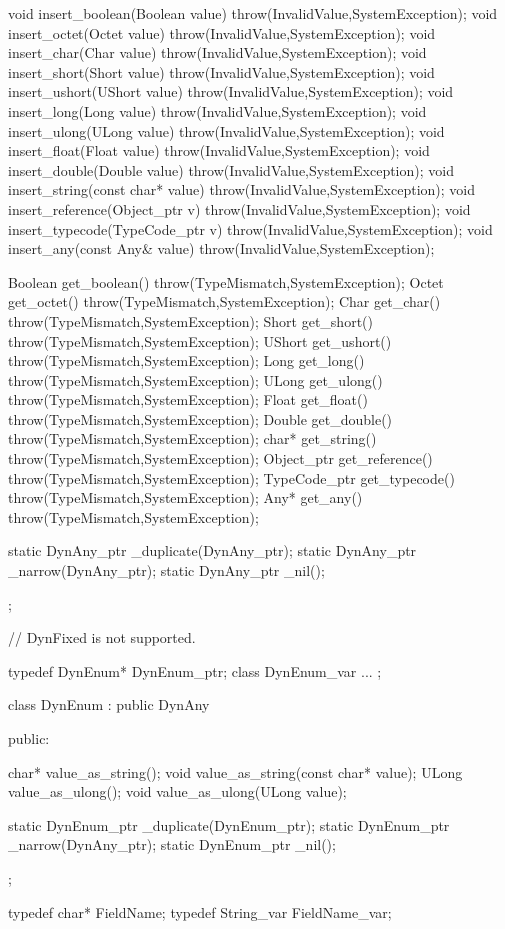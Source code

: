 \documentclass[11pt,twoside,a4paper]{book}
\begin{document}
\begin{cxxlisting}
{  void insert_boolean(Boolean value) throw(InvalidValue,SystemException);
  void insert_octet(Octet value) throw(InvalidValue,SystemException);
  void insert_char(Char value) throw(InvalidValue,SystemException);
  void insert_short(Short value) throw(InvalidValue,SystemException);
  void insert_ushort(UShort value) throw(InvalidValue,SystemException);
  void insert_long(Long value) throw(InvalidValue,SystemException);
  void insert_ulong(ULong value) throw(InvalidValue,SystemException);
  void insert_float(Float value) throw(InvalidValue,SystemException);
  void insert_double(Double value) throw(InvalidValue,SystemException);
  void insert_string(const char* value) throw(InvalidValue,SystemException);
  void insert_reference(Object_ptr v) throw(InvalidValue,SystemException);
  void insert_typecode(TypeCode_ptr v) throw(InvalidValue,SystemException);
  void insert_any(const Any& value) throw(InvalidValue,SystemException);

  Boolean get_boolean() throw(TypeMismatch,SystemException);
  Octet get_octet() throw(TypeMismatch,SystemException);
  Char get_char() throw(TypeMismatch,SystemException);
  Short get_short() throw(TypeMismatch,SystemException);
  UShort get_ushort() throw(TypeMismatch,SystemException);
  Long get_long() throw(TypeMismatch,SystemException);
  ULong get_ulong() throw(TypeMismatch,SystemException);
  Float get_float() throw(TypeMismatch,SystemException);
  Double get_double() throw(TypeMismatch,SystemException);
  char* get_string() throw(TypeMismatch,SystemException);
  Object_ptr get_reference() throw(TypeMismatch,SystemException);
  TypeCode_ptr get_typecode() throw(TypeMismatch,SystemException);
  Any* get_any() throw(TypeMismatch,SystemException);

  static DynAny_ptr _duplicate(DynAny_ptr);
  static DynAny_ptr _narrow(DynAny_ptr);
  static DynAny_ptr _nil();
};

// DynFixed is not supported.

typedef DynEnum* DynEnum_ptr;
class DynEnum_var { ... };

class DynEnum :  public DynAny {
public:

  char* value_as_string();
  void value_as_string(const char* value);
  ULong value_as_ulong();
  void value_as_ulong(ULong value);

  static DynEnum_ptr _duplicate(DynEnum_ptr);
  static DynEnum_ptr _narrow(DynAny_ptr);
  static DynEnum_ptr _nil();
};

typedef char* FieldName;
typedef String_var FieldName_var;


\end{cxxlisting}
\end{document}
